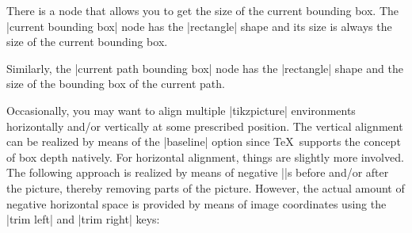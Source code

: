 There is a node that allows you to get the size of the current bounding box.
The |current bounding box| node has the |rectangle| shape and its size is
always the size of the current bounding box.

Similarly, the |current path bounding box| node has the |rectangle| shape and
the size of the bounding box of the current path.
%
\begin{codeexample}[]
\end{codeexample}

Occasionally, you may want to align multiple |tikzpicture| environments
horizontally and/or vertically at some prescribed position. The vertical
alignment can be realized by means of the |baseline| option since \TeX\
supports the concept of box depth natively. For horizontal alignment, things
are slightly more involved. The following approach is realized by means of
negative |\hspace|s before and/or after the picture, thereby removing parts of
the picture. However, the actual amount of negative horizontal space is
provided by means of image coordinates using the |trim left| and |trim right|
keys:

